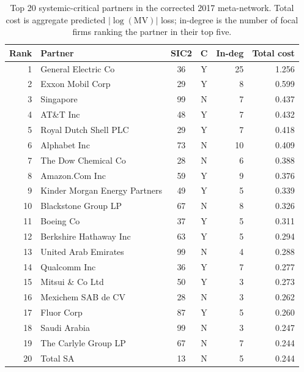 \documentclass[11pt,letterpaper]{article}
\begin{document}
\begin{table}[H]
\centering
\footnotesize
\caption{Top 20 systemic-critical partners in the corrected 2017
meta-network.  Total cost is aggregate predicted $|\log(\mathrm{MV})|$
loss; in-degree is the number of focal firms ranking the partner in
their top five.}
\label{tab:top20}
\begin{tabular}{rlccrr}
\toprule
Rank & Partner & SIC2 & C & In-deg & Total cost \\
\midrule
1  & General Electric Co              & 36 & Y & 25 & 1.256 \\
2  & Exxon Mobil Corp                 & 29 & Y &  8 & 0.599 \\
3  & Singapore                        & 99 & N &  7 & 0.437 \\
4  & AT\&T Inc                        & 48 & Y &  7 & 0.432 \\
5  & Royal Dutch Shell PLC            & 29 & Y &  7 & 0.418 \\
6  & Alphabet Inc                     & 73 & N & 10 & 0.409 \\
7  & The Dow Chemical Co              & 28 & N &  6 & 0.388 \\
8  & Amazon.Com Inc                   & 59 & Y &  9 & 0.376 \\
9  & Kinder Morgan Energy Partners    & 49 & Y &  5 & 0.339 \\
10 & Blackstone Group LP              & 67 & N &  8 & 0.326 \\
11 & Boeing Co                        & 37 & Y &  5 & 0.311 \\
12 & Berkshire Hathaway Inc           & 63 & Y &  5 & 0.294 \\
13 & United Arab Emirates             & 99 & N &  4 & 0.288 \\
14 & Qualcomm Inc                     & 36 & Y &  7 & 0.277 \\
15 & Mitsui \& Co Ltd                 & 50 & Y &  3 & 0.273 \\
16 & Mexichem SAB de CV               & 28 & N &  3 & 0.262 \\
17 & Fluor Corp                       & 87 & Y &  5 & 0.260 \\
18 & Saudi Arabia                     & 99 & N &  3 & 0.247 \\
19 & The Carlyle Group LP             & 67 & N &  7 & 0.244 \\
20 & Total SA                         & 13 & N &  5 & 0.244 \\
\bottomrule
\end{tabular}
\end{table}
\end{document}
